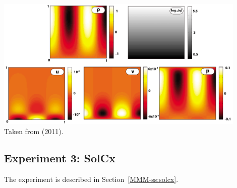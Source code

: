 \begin{center}
\includegraphics[width=12cm]{python_codes/fieldstone_158/images/solkz}\\
{\captionfont Taken from \textcite{dumg11} (2011). }
\end{center} 



\newpage
\subsection*{Experiment 3: SolCx}

The experiment is described in Section~\ref{MMM-ss:solcx}.

